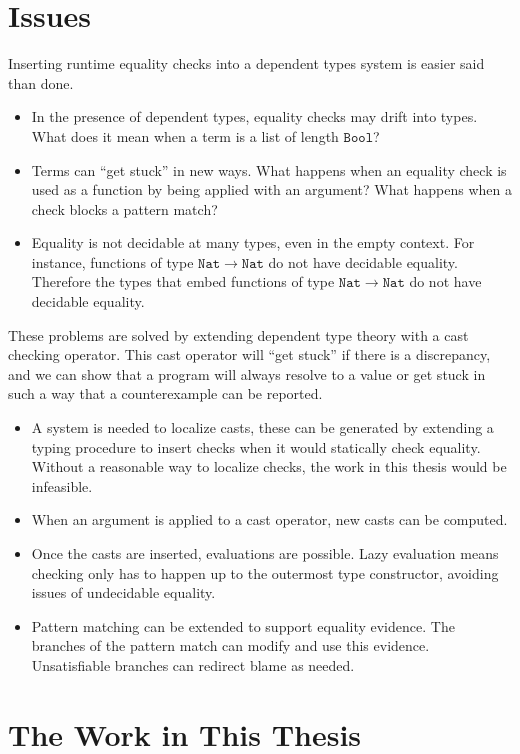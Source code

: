 \section{Issues}

Inserting runtime equality checks into a dependent types system is easier said than done.
\begin{itemize}
\item In the presence of dependent types, equality checks may drift into types.
What does it mean when a term is a list of length $\mathtt{Bool}$?
\item Terms can ``get stuck'' in new ways. 
What happens when an equality check is used as a function by being applied with an argument?
What happens when a check blocks a pattern match?
\item Equality is not decidable at many types, even in the empty context.
For instance, functions of type $\mathtt{Nat}\rightarrow\mathtt{Nat}$ do not have decidable equality.
Therefore the types that embed functions of type $\mathtt{Nat}\rightarrow\mathtt{Nat}$ do not have decidable equality.
\end{itemize}
These problems are solved by extending dependent type theory with a cast checking operator.
This cast operator will ``get stuck'' if there is a discrepancy, and we can show that a program will always resolve to a value or get stuck in such a way that a counterexample can be reported.
\begin{itemize}
\item A system is needed to localize casts, these can be generated by extending a \textbf{\bidir{}} typing procedure to insert checks when it would statically check equality.
Without a reasonable way to localize checks, the work in this thesis would be infeasible.
\item When an argument is applied to a cast operator, new casts can be computed. %
\item Once the casts are inserted, evaluations are possible.
Lazy evaluation means checking only has to happen up to the outermost type constructor, avoiding issues of undecidable equality.
\item Pattern matching can be extended to support equality evidence.
The branches of the pattern match can modify and use this evidence.
Unsatisfiable branches can redirect blame as needed.
\end{itemize}

\section{The Work in This Thesis}

